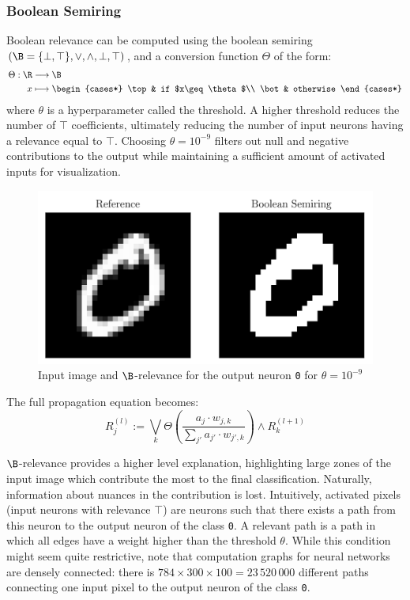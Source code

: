 \documentclass{../cs-classes/cs-classes}
\newcommand*{\1}{\digitsbb{1}}
\newcommand*{\0}{\digitsbb{0}}
\begin{document}
\subsubsection{Boolean Semiring}
Boolean relevance can be computed using the boolean semiring $(\B=\{\bot, \top\}, \lor, \land, \bot, \top)$, and a conversion function $\Theta$ of the form:
\begin{equation}
    \begin{aligned}
        \Theta: \R&\longrightarrow\B\\
        x&\longmapsto \begin{cases*}
            \top & if $x\geq\theta$\\
            \bot & otherwise
        \end{cases*}
    \end{aligned}
\end{equation}
where $\theta$ is a hyperparameter called the threshold. A higher threshold reduces the number of $\top$ coefficients, ultimately reducing the number of input neurons having a relevance equal to $\top$. Choosing $\theta=10^{-9}$ filters out null and negative contributions to the output while maintaining a sufficient amount of activated inputs for visualization.

\begin{figure}[H]
    \centering
    \includegraphics[width=.5\textwidth]{boolean.png}
    \caption{Input image and $\B$-relevance for the output neuron \texttt{0} for $\theta=10^{-9}$}
\end{figure}

The full propagation equation becomes:
\begin{equation}
    R^{(l)}_j := \bigvee_{k}\Theta\left(\frac{a_j\cdot w_{j, k}}{\sum_{j'}a_{j'}\cdot w_{j', k}}\right) \land R^{(l+1)}_k
    \label{eq:boolean-lrp}
\end{equation}

$\B$-relevance provides a higher level explanation, highlighting large zones of the input image which contribute the most to the final classification.
Naturally, information about nuances in the contribution is lost. Intuitively, activated pixels (input neurons with relevance $\top$) are neurons such that there exists a  path from this neuron to the output neuron of the class \texttt{0}. A relevant path is a path in which all edges have a weight higher than the threshold $\theta$. While this condition might seem quite restrictive, note that computation graphs for neural networks are densely connected: there is $784\times300\times100=23\,520\,000$ different paths connecting one input pixel to the output neuron of the class \texttt{0}.
\end{document}
